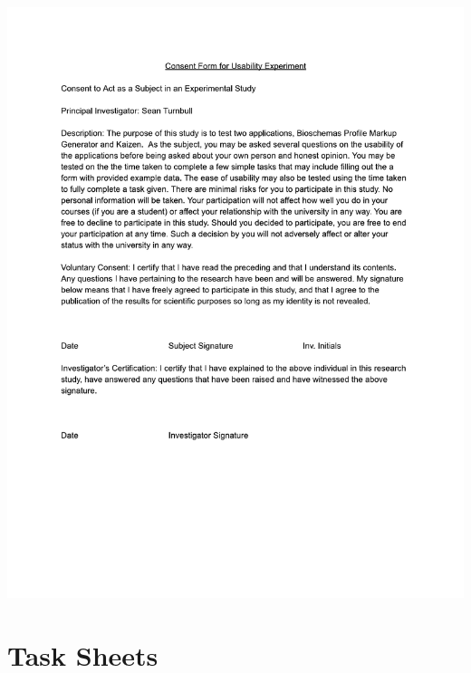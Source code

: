 \begin{centering}
\includegraphics[trim = 40 160 0 60,scale=0.9]{ConsentForm.pdf}
\end{centering}



\newpage
\section{Task Sheets}

